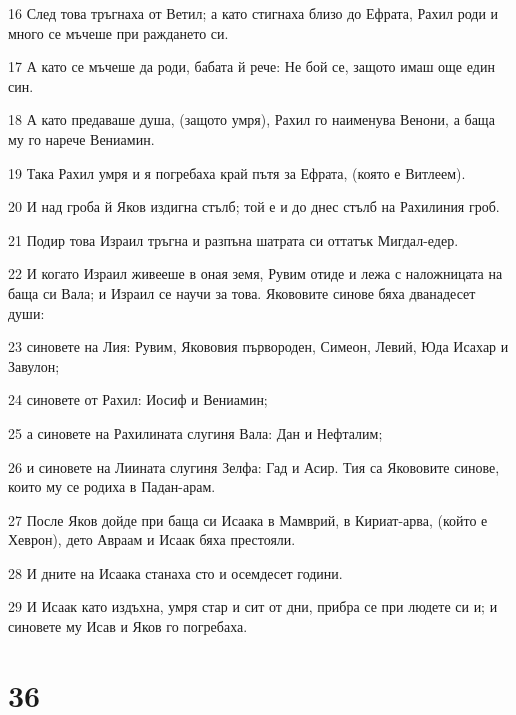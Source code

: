 \par 16 След това тръгнаха от Ветил; а като стигнаха близо до Ефрата, Рахил роди и много се мъчеше при раждането си.
\par 17 А като се мъчеше да роди, бабата й рече: Не бой се, защото имаш още един син.
\par 18 А като предаваше душа, (защото умря), Рахил го наименува Венони, а баща му го нарече Вениамин.
\par 19 Така Рахил умря и я погребаха край пътя за Ефрата, (която е Витлеем).
\par 20 И над гроба й Яков издигна стълб; той е и до днес стълб на Рахилиния гроб.
\par 21 Подир това Израил тръгна и разпъна шатрата си оттатък Мигдал-едер.
\par 22 И когато Израил живееше в оная земя, Рувим отиде и лежа с наложницата на баща си Вала; и Израил се научи за това. Якововите синове бяха дванадесет души:
\par 23 синовете на Лия: Рувим, Якововия първороден, Симеон, Левий, Юда Исахар и Завулон;
\par 24 синовете от Рахил: Иосиф и Вениамин;
\par 25 а синовете на Рахилината слугиня Вала: Дан и Нефталим;
\par 26 и синовете на Лиината слугиня Зелфа: Гад и Асир. Тия са Якововите синове, които му се родиха в Падан-арам.
\par 27 После Яков дойде при баща си Исаака в Мамврий, в Кириат-арва, (който е Хеврон), дето Авраам и Исаак бяха престояли.
\par 28 И дните на Исаака станаха сто и осемдесет години.
\par 29 И Исаак като издъхна, умря стар и сит от дни, прибра се при людете си и; и синовете му Исав и Яков го погребаха.

\chapter{36}


